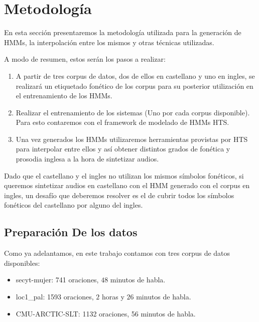 \section{Metodología}

En esta sección presentaremos la metodología utilizada para la generación de HMMs, la interpolación entre los mismos y otras técnicas utilizadas.

A modo de resumen, estos serán los pasos a realizar:

\begin{enumerate}

\item A partir de tres corpus de datos, dos de ellos en castellano y uno en ingles, se realizará un etiquetado fonético de los corpus para su posterior utilización en el entrenamiento de los HMMs.

\item Realizar el entrenamiento de los sistemas (Uno por cada corpus disponible). Para esto contaremos con el framework de modelado de HMMs HTS. 

\item Una vez generados los HMMs utilizaremos herramientas provistas por HTS para interpolar entre ellos y así obtener distintos grados de fonética y prosodia inglesa a la hora de sintetizar audios.

\end{enumerate}

Dado que el castellano y el ingles no utilizan los mismos símbolos fonéticos, si queremos sintetizar audios en castellano con el HMM generado con el corpus en ingles, un desafío que deberemos resolver es el de cubrir todos los símbolos fonéticos del castellano por alguno del ingles.

\subsection{Preparación De los datos}

Como ya adelantamos, en este trabajo contamos con tres corpus de datos disponibles:

\begin{itemize}
\item secyt-mujer: 741 oraciones, $48$ minutos de habla.
\item loc1\_pal: 1593 oraciones, $2$ horas y $26$ minutos de habla.
\item CMU-ARCTIC-SLT: 1132 oraciones, 56 minutos de habla.
\end{itemize}

